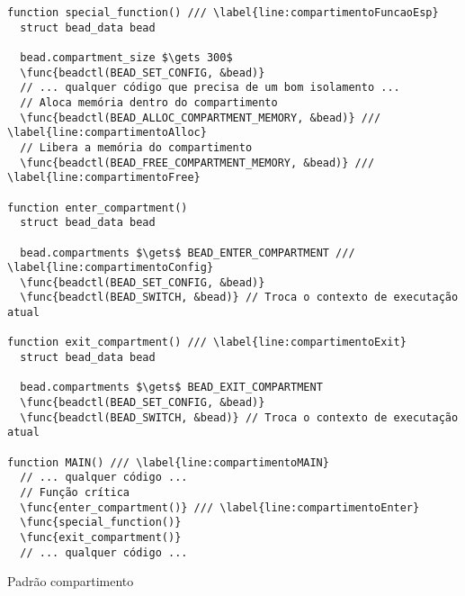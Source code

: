 \begin{pseudocode}
\begin{lstlisting}[language=pseudocode, style=pseudocode]
function special_function() /// \label{line:compartimentoFuncaoEsp}
  struct bead_data bead

  bead.compartment_size $\gets 300$
  \func{beadctl(BEAD_SET_CONFIG, &bead)}
  // ... qualquer código que precisa de um bom isolamento ...
  // Aloca memória dentro do compartimento
  \func{beadctl(BEAD_ALLOC_COMPARTMENT_MEMORY, &bead)} /// \label{line:compartimentoAlloc}
  // Libera a memória do compartimento
  \func{beadctl(BEAD_FREE_COMPARTMENT_MEMORY, &bead)} /// \label{line:compartimentoFree}

function enter_compartment()
  struct bead_data bead

  bead.compartments $\gets$ BEAD_ENTER_COMPARTMENT /// \label{line:compartimentoConfig}
  \func{beadctl(BEAD_SET_CONFIG, &bead)}
  \func{beadctl(BEAD_SWITCH, &bead)} // Troca o contexto de executação atual

function exit_compartment() /// \label{line:compartimentoExit}
  struct bead_data bead

  bead.compartments $\gets$ BEAD_EXIT_COMPARTMENT
  \func{beadctl(BEAD_SET_CONFIG, &bead)}
  \func{beadctl(BEAD_SWITCH, &bead)} // Troca o contexto de executação atual

function MAIN() /// \label{line:compartimentoMAIN}
  // ... qualquer código ...
  // Função crítica
  \func{enter_compartment()} /// \label{line:compartimentoEnter}
  \func{special_function()}
  \func{exit_compartment()}
  // ... qualquer código ...

\end{lstlisting}

  \caption{Padrão compartimento}
  \label{alg:compartimento}
\end{pseudocode}
